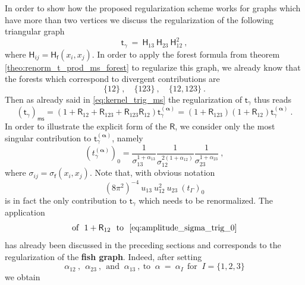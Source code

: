 \documentclass[12pt]{book}
\newcommand{\ms}{\mathsf{ms}}
\newcommand{\Hsf}{\mathsf{H}}
\newcommand{\Rsf}{\mathsf{R}}
\newcommand{\fsf}{\mathsf{f}}
\newcommand{\tsf}{\mathsf{t}}
\theoremstyle{break}
\begin{document}
In order to show how the proposed regularization scheme works for graphs which have more than two vertices we discuss the regularization of the following triangular graph
%
\begin{equation*}
\tsf_\gamma \ = \ \Hsf_{13} \ \Hsf_{23} \ \Hsf_{12}^2 \ , 
\end{equation*}
%
where $\Hsf_{ij} = \Hsf_\fsf(x_i,x_j)$. In order to apply the forest formula from theorem \ref{theo:renorm_t_prod_ms_forest} to regularize this graph, we already know that the forests which correspond to divergent contributions are 
%
\begin{equation*}
\{12\} \ , \quad \{123\} \ , \quad \{12,123\} \ .
\end{equation*} 
%
Then as already said in \eqref{eq:kernel_trig_ms} the regularization of $\tsf_\gamma$ thus reads
%
\begin{equation*}
\left(\tsf_\gamma\right)_\ms = \left(1+\Rsf_{12}+\Rsf_{123}+\Rsf_{123}\Rsf_{12}\right) \tsf^{(\boldsymbol{\alpha})}_\gamma = (1+\Rsf_{123})(1+\Rsf_{12}) \tsf^{(\boldsymbol{\alpha})}_\gamma \ .
\end{equation*}
%
In order to illustrate the explicit form of the $\Rsf$, we consider only the most singular contribution to $\tsf^{(\boldsymbol{\alpha})}_\gamma$, namely
%
\begin{equation}
\left(t_{\gamma}^{(\boldsymbol{\alpha})}\right)_0 = \frac{1}{\sigma_{13}^{1+\alpha_{13}}} \frac{1}{\sigma_{12}^{2(1+\alpha_{12})}} \frac{1}{\sigma_{23}^{1+\alpha_{23}}} \ ,
\label{eq:amplitude_sigma_trig_0}
\end{equation}
%
where $\sigma_{ij} = \sigma_\fsf(x_i,x_j)$. Note that, with obvious notation
%
\begin{equation*}
(8\pi^2)^{-4} \ u_{13} \ u^2_{12} \ u_{23} \ \left(t_{\Gamma}\right)_0 
\end{equation*}
%
is in fact the only contribution to $\tsf_\gamma$ which needs to be renormalized. The application  
%
\begin{equation*}
\mbox{of } \ 1 + \Rsf_{12} \ \mbox{ to } \ \eqref{eq:amplitude_sigma_trig_0}
\end{equation*}
% 
has already been discussed in the preceding sections and corresponds to the regularization of the \textbf{fish graph}. Indeed, after setting 
%
\begin{equation*}
\alpha_{12} \ , \ \ \alpha_{23} \ , \ \ \mbox{and } \ \alpha_{13} \ , \ \mbox{to } \ \alpha \ = \ \alpha_I \ \ \mbox{for } \ I=\{1,2,3\} 
\end{equation*}
%
we obtain
\end{document}
